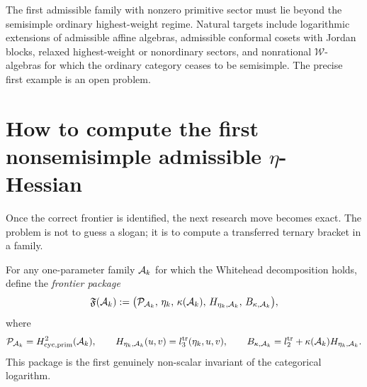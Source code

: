 \begin{remark}
\label{rem:true-admissible-frontier}
The first admissible family with nonzero primitive sector must lie beyond the
semisimple ordinary highest-weight regime.  Natural targets include logarithmic
extensions of admissible affine algebras, admissible conformal cosets with
Jordan blocks, relaxed highest-weight or nonordinary sectors, and nonrational
$\mathcal{W}$-algebras for which the ordinary category ceases to be semisimple.
The precise first example is an open problem.
\end{remark}

\section{How to compute the first nonsemisimple admissible \texorpdfstring{$\eta$}{eta}-Hessian}
\label{sec:procedure-compute-hessian}

Once the correct frontier is identified, the next research move becomes exact.
The problem is not to guess a slogan; it is to compute a transferred ternary
bracket in a family.

\begin{construction}
\label{cons:frontier-package}
For any one-parameter family $\mathcal{A}_k$ for which the Whitehead decomposition
holds, define the \emph{frontier package}
\[
\mathfrak{F}(\mathcal{A}_k):=
\bigl(\mathcal{P}_{\mathcal{A}_k},\,\eta_k,\,\kappa(\mathcal{A}_k),\,H_{\eta_k,\mathcal{A}_k},\,B_{\kappa,\mathcal{A}_k}\bigr),
\]
where
\[
\mathcal{P}_{\mathcal{A}_k}=H^2_{\mathrm{cyc,prim}}(\mathcal{A}_k),
\qquad
H_{\eta_k,\mathcal{A}_k}(u,v)=l_3^{\mathrm{tr}}(\eta_k,u,v),
\qquad
B_{\kappa,\mathcal{A}_k}=l_2^{\mathrm{tr}}+\kappa(\mathcal{A}_k)H_{\eta_k,\mathcal{A}_k}.
\]
This package is the first genuinely non-scalar invariant of the categorical
logarithm.
\end{construction}


